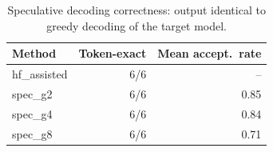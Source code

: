 \begin{table}[t]\centering\small
\caption{Speculative decoding correctness: output identical to greedy decoding of the target model.}\label{tab:speceq}
\begin{tabular}{lrr}
\toprule
Method & Token-exact & Mean accept.\ rate \\
\midrule
hf\_assisted & 6/6 & -- \\
spec\_g2 & 6/6 & 0.85 \\
spec\_g4 & 6/6 & 0.84 \\
spec\_g8 & 6/6 & 0.71 \\
\bottomrule
\end{tabular}
\end{table}
